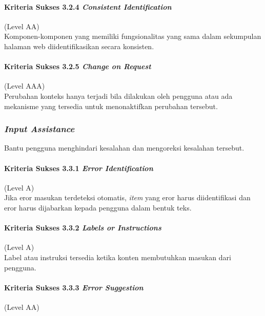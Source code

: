 \documentclass[a4paper,twoside]{article}
\begin{document}
\begin{enumerate}
		\paragraph{Kriteria Sukses 3.2.4 \textit{Consistent Identification}}
		\label{sec:kriteria_sukses_3.2.4}
		(Level AA)\\

		Komponen-komponen yang memiliki fungsionalitas yang sama dalam sekumpulan halaman web diidentifikasikan secara konsisten.

		\paragraph{Kriteria Sukses 3.2.5 \textit{Change on Request}}
		\label{sec:kriteria_sukses_3.2.5}
		(Level AAA)\\

		Perubahan konteks hanya terjadi bila dilakukan oleh pengguna atau ada mekanisme yang tersedia untuk menonaktifkan perubahan tersebut.

		\subsubsection*{\textit{Input Assistance}}
		\label{sec:input_assistance}
		Bantu pengguna menghindari kesalahan dan mengoreksi kesalahan tersebut.

		\paragraph{Kriteria Sukses 3.3.1 \textit{Error Identification}}
		\label{sec:kriteria_sukses_3.3.1}
		(Level A)\\

		Jika eror masukan terdeteksi otomatis, \textit{item} yang eror harus diidentifikasi dan eror harus dijabarkan kepada pengguna dalam bentuk teks.

		\paragraph{Kriteria Sukses 3.3.2 \textit{Labels or Instructions}}
		\label{sec:kriteria_sukses_3.3.2}
		(Level A)\\

		Label atau instruksi tersedia ketika konten membutuhkan masukan dari pengguna.

		\paragraph{Kriteria Sukses 3.3.3 \textit{Error Suggestion}}
		\label{sec:kriteria_sukses_3.3.3}
		(Level AA)\\


\end{enumerate}
\end{document}
